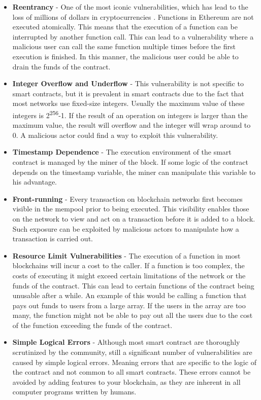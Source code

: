 \begin{itemize}
    \item \textbf{Reentrancy} - One of the most iconic vulnerabilities, which has lead to the loss of millions of dollars in cryptocurrencies \cite{pcaversaccio_chronological_nodate}. Functions in Ethereum are not executed atomically. This means that the execution of a function can be interrupted by another function call. This can lead to a vulnerability where a malicious user can call the same function multiple times before the first execution is finished. In this manner, the malicious user could be able to drain the funds of the contract.
    \item \textbf{Integer Overflow and Underflow} - This vulnerability is not specific to smart contracts, but it is prevalent in smart contracts due to the fact that most networks use fixed-size integers. Usually the maximum value of these integers is 2\textsuperscript{256}-1. If the result of an operation on integers is larger than the maximum value, the result will overflow and the integer will wrap around to 0. A malicious actor could find a way to exploit this vulnerability.
    \item \textbf{Timestamp Dependence} - The execution environment of the smart contract is managed by the miner of the block. If some logic of the contract depends on the timestamp variable, the miner can manipulate this variable to his advantage.
    \item \textbf{Front-running} - Every transaction on blockchain networks first becomes visible in the mempool prior to being executed. This visibility enables those on the network to view and act on a transaction before it is added to a block. Such exposure can be exploited by malicious actors to manipulate how a transaction is carried out.
    \item \textbf{Resource Limit Vulnerabilities} - The execution of a function in most blockchains will incur a cost to the caller. If a function is too complex, the costs of executing it might exceed certain limitations of the network or the funds of the contract. This can lead to certain functions of the contract being unusable after a while. An example of this would be calling a function that pays out funds to users from a large array. If the users in the array are too many, the function might not be able to pay out all the users due to the cost of the function exceeding the funds of the contract.
    \item \textbf{Simple Logical Errors} - Although most smart contract are thoroughly scrutinized by the community, still a significant number of vulnerabilities are caused by simple logical errors.
          Meaning errors that are specific to the logic of the contract and not common to all smart contracts.
          These errors cannot be avoided by adding features to your blockchain, as they are inherent in all computer programs written by humans.
\end{itemize}

